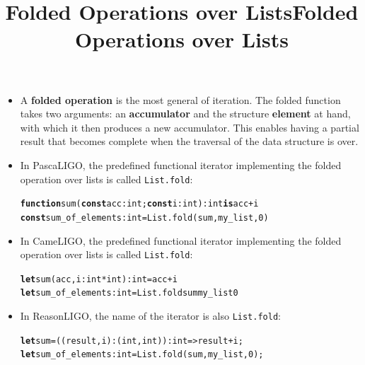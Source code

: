 \documentclass[wide]{slides}
\newcommand{\Kconst}[0]{\textbf{const}\xspace}
\newcommand{\Kfunction}[0]{\textbf{function}\xspace}
\newcommand{\Kis}[0]{\textbf{is}\xspace}
\newcommand{\Klet}[0]{\textbf{let}\xspace}
\begin{document}
\begin{slide}
  \title{Folded Operations over Lists}

  \begin{itemize}

    \item A \textbf{folded operation} is the most general of
      iteration. The folded function takes two arguments: an
      \textbf{accumulator} and the structure \textbf{element} at hand,
      with which it then produces a new accumulator. This enables
      having a partial result that becomes complete when the traversal
      of the data structure is over.

    \item In PascaLIGO, the predefined functional iterator
      implementing the folded operation over lists is called
      \texttt{List.fold}:
      \begin{alltt}
\Kfunction sum (\Kconst acc : int; \Kconst i : int): int \Kis acc + i
\Kconst sum_of_elements : int = List.fold (sum, my_list, 0)
      \end{alltt}

  \end{itemize}

\end{slide}

\begin{slide}
  \title{Folded Operations over Lists}

  \begin{itemize}

    \item In CameLIGO, the predefined functional iterator implementing
      the folded operation over lists is called \texttt{List.fold}:
      \begin{alltt}
\Klet sum (acc, i: int * int) : int = acc + i
\Klet sum_of_elements : int = List.fold sum my_list 0
      \end{alltt}

    \item In ReasonLIGO, the name of the iterator is also
      \texttt{List.fold}:
      \begin{alltt}
\Klet sum = ((result, i): (int, int)): int => result + i;
\Klet sum_of_elements : int = List.fold (sum, my_list, 0);
      \end{alltt}

  \end{itemize}

\end{slide}
\end{document}
